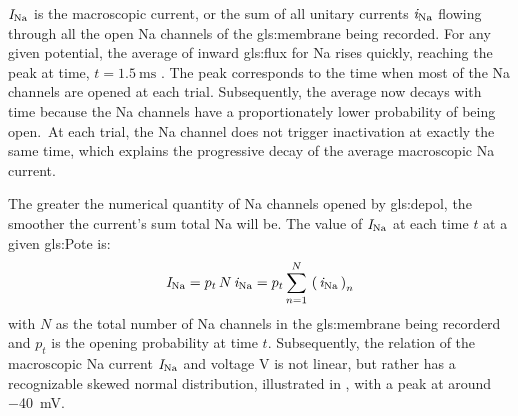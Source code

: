\documentclass[class={myRUCProject}, crop=false]{standalone}
\begin{document}
{}\(\mathit{I}_\mathrm{Na}\) is the macroscopic current, or the sum of all unitary currents \(\mathit{i}_\mathrm{Na}\) flowing through all the open \gls{Na} channels of the \gls{gls:membrane} being recorded. %
For any given potential, the average of inward \gls{gls:flux} for \gls{Na} rises quickly, reaching the peak at time, \(t=\qty{1.5}{\ms}\) \cite{Hammond2015ch4}. 
The peak corresponds to the time when most of the \gls{Na} channels are opened at each trial. 
Subsequently, the average now decays with time because the \gls{Na} channels have a proportionately lower probability of being open.\footnotemark~At each trial, the \gls{Na} channel does not trigger inactivation at exactly the same time, which explains the progressive decay of the average macroscopic \gls{Na} current. 



The greater the numerical quantity of \gls{Na} channels opened by \gls{gls:depol}, the smoother the current's sum total \gls{Na} will be. 
The value of \(\mathit{I}_\mathrm{Na}\) at each time \(t\) at a given \gls{gls:Pote} is: 
\begin{equation}
  \mathit{I}_\mathrm{Na} = p_t \, N \, \mathit{i}_\mathrm{Na} = p_t \sum^N_{n=1} \, \left(\,\mathit{i}_\mathrm{Na}\,\right)_n \label{eq:nasum}
\end{equation}
with \(N\) as the total number of \gls{Na} channels in the \gls{gls:membrane} being recorderd and \(p_t\) is the opening probability at time \(t\). 
Subsequently, the relation of the macroscopic \gls{Na} current \(\mathit{I}_\mathrm{Na}\) and voltage \(\unit{\V}\) is not linear, but rather has a recognizable skewed normal distribution, illustrated in \textbf{}, with a peak at around \qty{-40}{\mV}. 
 
\end{document}
